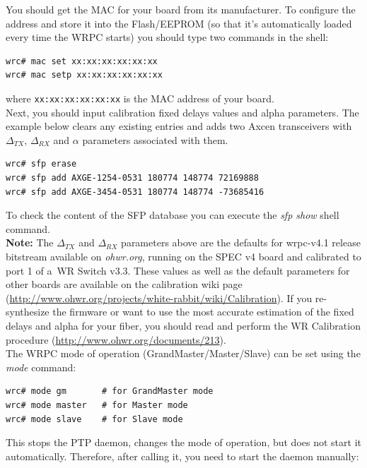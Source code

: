 \documentclass[a4paper, 12pt]{article}
\renewcommand{\_}{\underscore\allowbreak}
\begin{document}
You should get the MAC for your board from its manufacturer. To configure the
address and store it into the Flash/EEPROM (so that it's automatically loaded
every time the WRPC starts) you should type two commands in the shell:
\begin{lstlisting}
wrc# mac set xx:xx:xx:xx:xx:xx
wrc# mac setp xx:xx:xx:xx:xx:xx
\end{lstlisting}
where \texttt{xx:xx:xx:xx:xx:xx} is the MAC address of your board.\\

Next, you should input calibration fixed delays values and alpha parameters. The
example below clears any existing entries and adds two Axcen transceivers with
$\Delta_{TX}$, $\Delta_{RX}$ and $\alpha$ parameters associated with them.

\begin{lstlisting}
wrc# sfp erase
wrc# sfp add AXGE-1254-0531 180774 148774 72169888
wrc# sfp add AXGE-3454-0531 180774 148774 -73685416
\end{lstlisting}

To check the content of the SFP database you can execute the \textit{sfp show}
shell command.\\

\noindent\textbf{Note:} The $\Delta_{TX}$ and $\Delta_{RX}$ parameters above are
the defaults for wrpc-v4.1 release bitstream available on \textit{ohwr.org},
running on the SPEC v4 board and calibrated to port 1 of a~WR Switch
v3.3. These values as well as the default parameters for other boards are
available on the calibration wiki page
(\url{http://www.ohwr.org/projects/white-rabbit/wiki/Calibration}). If you
re-synthesize the firmware or want to use the most accurate estimation of
the fixed delays and alpha for your fiber, you should read and perform the WR
Calibration procedure (\url{http://www.ohwr.org/documents/213}).\\

The WRPC  mode of operation (GrandMaster/Master/Slave) can be set
using the \textit{mode} command:

\begin{lstlisting}
wrc# mode gm       # for GrandMaster mode
wrc# mode master   # for Master mode
wrc# mode slave    # for Slave mode
\end{lstlisting}

This stops the PTP daemon, changes the mode of operation, but does not start it
automatically. Therefore, after calling it, you need to start the daemon
manually:
\end{document}
